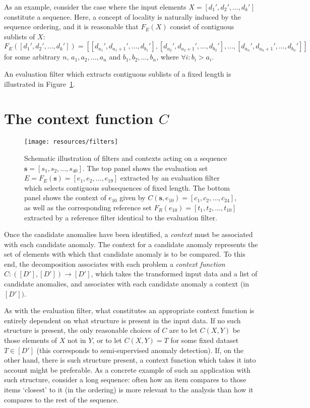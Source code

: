 As an example, consider the case where the input elements $X = [d_1', d_2', \dots, d_k']$ constitute a sequence. Here, a concept of locality is naturally induced by the sequence ordering, and it is reasonable that $F_E(X)$ consist of contiguous sublists of $X$:
\[
    F_E([d_1', d_2', \dots, d_k']) = [[d_{a_1}', d_{a_1 + 1}', \dots, d_{b_1}'], [d_{a_2}', d_{a_2 + 1}', \dots, d_{b_2}'], \dots, [d_{a_n}', d_{a_n + 1}', \dots, d_{b_n}']]
\]
for some arbitrary $n$, $a_1, a_2, \dots, a_n$ and $b_1, b_2, \dots, b_n$, where $\forall i: b_i > a_i$.

An evaluation filter which extracts contiguous sublists of a fixed length is illustrated in Figure~\ref{fig:filters}.

\section{The context function $C$}

\begin{figure}[htb]
    \begin{center}
        \texttt{[image: resources/filters]}
    \end{center}
    \caption{{\small Schematic illustration of filters and contexts acting on a sequence $\mathbf{s} = [s_1, s_2, \dots, s_{40}]$. The top panel shows the evaluation set $E = F_E(\mathbf{s}) = [e_1, e_2, \dots, e_{19}]$ extracted by an evaluation filter which selects contiguous subsequences of fixed length. The bottom panel shows the context of $e_{10}$ given by $C(\mathbf{s}, e_{10}) = [c_1, c_2, \dots, c_{24}]$, as well as the corresponding reference set $F_R(e_{10}) = [t_1, t_2, \dots, t_{10}]$ extracted by a reference filter identical to the evaluation filter.}}
\label{fig:filters}
\end{figure}

Once the candidate anomalies have been identified, a \emph{context} must be associated with each candidate anomaly. The context for a candidate anomaly represents the set of elements with which that candidate anomaly is to be compared. To this end, the decomposition associates with each problem a \emph{context function} $C: ([D'], [D']) \rightarrow [D']$, which takes the transformed input data and a list of candidate anomalies, and associates with each candidate anomaly a context (in $[D'])$.

As with the evaluation filter, what constitutes an appropriate context function is entirely dependent on what structure is present in the input data. If no such structure is present, the only reasonable choices of $C$ are to let $C(X, Y)$ be those elements of $X$ not in $Y$, or to let $C(X, Y) = T$ for some fixed dataset $T \in [D']$ (this corresponds to semi-supervised anomaly detection). If, on the other hand, there is such structure present, a context function which takes it into account might be preferable. As a concrete example of such an application with such structure, consider a long sequence: often how an item compares to those items `closest' to it (in the ordering) is more relevant to the analysis than how it compares to the rest of the sequence.

